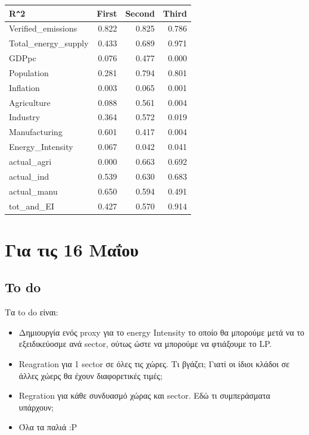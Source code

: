 \documentclass[a4paper,twoside,10pt]{article}
\begin{document}
\begin{table}[H]
	\centering
	\begin{tabular}{lrrr}
		\hline
		 R\verb|^|2 & First & Second & Third \\ 
		\hline
		Verified\_emissions  & 0.822 & 0.825 & 0.786 \\ 
		Total\_energy\_supply   & 0.433 & 0.689 & 0.971 \\ 
		GDPpc   & 0.076 & 0.477 & 0.000 \\ 
		Population   & 0.281 & 0.794 & 0.801 \\ 
		Inflation   & 0.003 & 0.065 & 0.001 \\ 
		Agriculture   & 0.088 & 0.561 & 0.004 \\ 
		Industry   & 0.364 & 0.572 & 0.019 \\ 
		Manufacturing   & 0.601 & 0.417 & 0.004 \\ 
		Energy\_Intensity   & 0.067 & 0.042 & 0.041 \\ 
		actual\_agri   & 0.000 & 0.663 & 0.692 \\ 
		actual\_ind   & 0.539 & 0.630 & 0.683 \\ 
		actual\_manu   & 0.650 & 0.594 & 0.491 \\ 
		tot\_and\_EI   & 0.427 & 0.570 & 0.914 \\ 
		\hline
	\end{tabular}
\end{table}

\newpage
\section {Για τις 16 Μαΐου}
\subsection{To do}
Τα to do είναι:
\begin{itemize}
	\item Δημιουργία ενός proxy για το energy Intensity το οποίο θα μπορούμε μετά να το εξειδικεύοσμε ανά sector, ούτως ώστε να μπορούμε να φτιάξουμε το LP.
	\item Reagration για 1 sector σε όλες τις χώρες. Τι βγάζει; Γιατί οι ίδιοι κλάδοι σε άλλες χώερς θα έχουν διαφορετικές τιμές;
	\item Regration για κάθε συνδυασμό χώρας και sector. Εδώ τι συμπεράσματα υπάρχουν;
	\item Όλα τα παλιά :Ρ
	\end{itemize}
\end{document}
